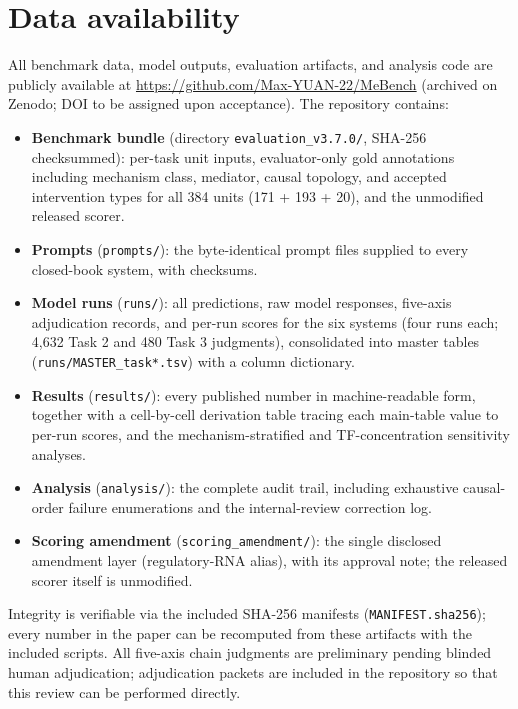 \section*{Data availability}

All benchmark data, model outputs, evaluation artifacts, and analysis code are publicly available at \url{https://github.com/Max-YUAN-22/MeBench} (archived on Zenodo; DOI to be assigned upon acceptance). The repository contains:

\begin{itemize}
  \item \textbf{Benchmark bundle} (directory \texttt{evaluation\_v3.7.0/}, SHA-256 checksummed): per-task unit inputs, evaluator-only gold annotations including mechanism class, mediator, causal topology, and accepted intervention types for all 384 units (171 + 193 + 20), and the unmodified released scorer.
  \item \textbf{Prompts} (\texttt{prompts/}): the byte-identical prompt files supplied to every closed-book system, with checksums.
  \item \textbf{Model runs} (\texttt{runs/}): all predictions, raw model responses, five-axis adjudication records, and per-run scores for the six systems (four runs each; 4,632 Task 2 and 480 Task 3 judgments), consolidated into master tables (\texttt{runs/MASTER\_task*.tsv}) with a column dictionary.
  \item \textbf{Results} (\texttt{results/}): every published number in machine-readable form, together with a cell-by-cell derivation table tracing each main-table value to per-run scores, and the mechanism-stratified and TF-concentration sensitivity analyses.
  \item \textbf{Analysis} (\texttt{analysis/}): the complete audit trail, including exhaustive causal-order failure enumerations and the internal-review correction log.
  \item \textbf{Scoring amendment} (\texttt{scoring\_amendment/}): the single disclosed amendment layer (regulatory-RNA alias), with its approval note; the released scorer itself is unmodified.
\end{itemize}

Integrity is verifiable via the included SHA-256 manifests (\texttt{MANIFEST.sha256}); every number in the paper can be recomputed from these artifacts with the included scripts. All five-axis chain judgments are preliminary pending blinded human adjudication; adjudication packets are included in the repository so that this review can be performed directly.
